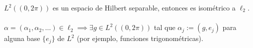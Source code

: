 \begin{ejemplo}
    $L^2((0, 2\pi))$ es un espacio de Hilbert separable, entonces es isométrico a $\ell_2$. \\ \\
    \noindent
    $\alpha = (\alpha_1, \alpha_2, \dots) \in \ell_2 \implies \exists g \in L^2((0, 2\pi))$ tal que $\alpha_j := (g, e_j)$ para alguna base $\{e_j\}$ de $L^2$ (por ejemplo, funciones trigonométricas).
\end{ejemplo}
